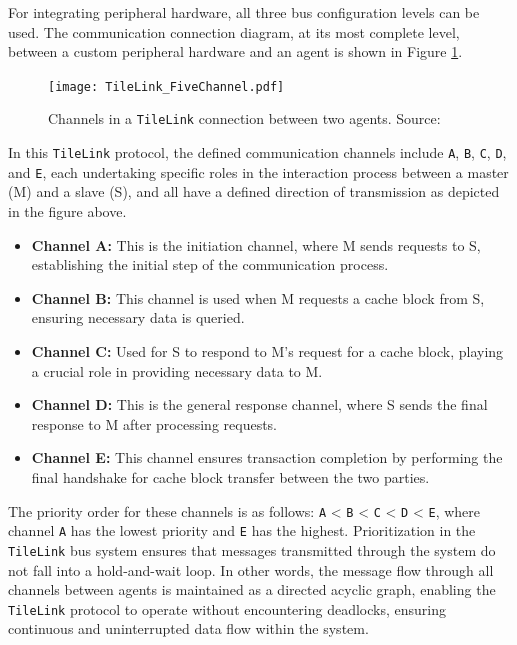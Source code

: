 For integrating peripheral hardware, all three bus configuration levels can be used. The communication connection diagram, at its most complete level, between a custom peripheral hardware and an agent is shown in Figure \ref{fig:tilelink_channels}.

\begin{figure}[h!]
    \centering
    \texttt{[image: TileLink\_FiveChannel.pdf]}
    \caption{Channels in a \texttt{TileLink} connection between two agents. Source: \cite{sifive2017tilelink}}
    \label{fig:tilelink_channels}
\end{figure}

In this \texttt{TileLink} protocol, the defined communication channels include \texttt{A}, \texttt{B}, \texttt{C}, \texttt{D}, and \texttt{E}, each undertaking specific roles in the interaction process between a master (M) and a slave (S), and all have a defined direction of transmission as depicted in the figure above.
\begin{itemize}
    \item \textbf{Channel A:} This is the initiation channel, where M sends requests to S, establishing the initial step of the communication process.
    \item \textbf{Channel B:} This channel is used when M requests a cache block from S, ensuring necessary data is queried.
    \item \textbf{Channel C:} Used for S to respond to M's request for a cache block, playing a crucial role in providing necessary data to M.
    \item \textbf{Channel D:} This is the general response channel, where S sends the final response to M after processing requests.
    \item \textbf{Channel E:} This channel ensures transaction completion by performing the final handshake for cache block transfer between the two parties.
\end{itemize}

The priority order for these channels is as follows: \texttt{A} < \texttt{B} < \texttt{C} < \texttt{D} < \texttt{E}, where channel \texttt{A} has the lowest priority and \texttt{E} has the highest. Prioritization in the \texttt{TileLink} bus system ensures that messages transmitted through the system do not fall into a hold-and-wait loop. In other words, the message flow through all channels between agents is maintained as a directed acyclic graph, enabling the \texttt{TileLink} protocol to operate without encountering deadlocks, ensuring continuous and uninterrupted data flow within the system.

